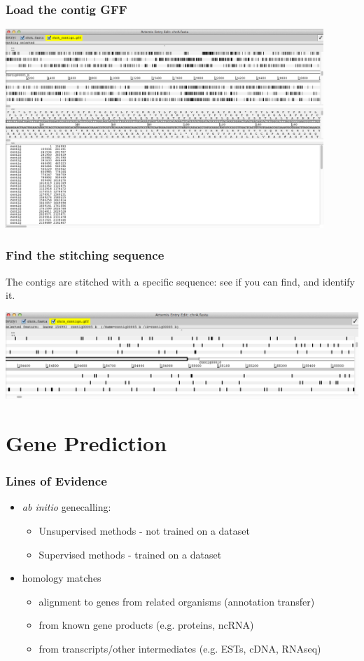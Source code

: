 \documentclass[table]{beamer}
\begin{document}
  \begin{frame}
    \frametitle{Load the contig GFF}
    \begin{center}
      \includegraphics[width=0.9\textwidth]{images/artemis_loaded_contigs} 
    \end{center}
\end{frame}

  \begin{frame}
    \frametitle{Find the stitching sequence}
    The contigs are stitched with a specific sequence: see if you can find, and identify it.
    \begin{center}
      \includegraphics[width=\textwidth]{images/artemis_stitch_tease} 
    \end{center}
\end{frame}

  \section{Gene Prediction}
    \begin{frame}
     \frametitle{Lines of Evidence}
     \begin{itemize}
       \item \textit{ab initio} genecalling: 
       \begin{itemize}
         \item Unsupervised methods - not trained on a dataset
         \item Supervised methods - trained on a dataset
       \end{itemize}
       \item homology matches
       \begin{itemize}
         \item alignment to genes from related organisms (annotation transfer)
         \item from known gene products (e.g. proteins, ncRNA)
         \item from transcripts/other intermediates (e.g. ESTs, cDNA, RNAseq)
       \end{itemize}
     \end{itemize}
    \end{frame}
    
\end{document}
